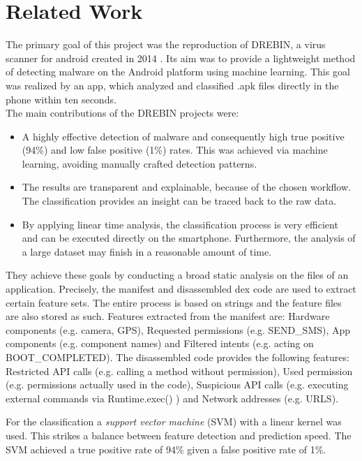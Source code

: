 \section{Related Work}

The primary goal of this project was the reproduction of DREBIN, a
virus scanner for android created in 2014 \cite{drebin}.
Its aim was to provide a lightweight method of detecting malware on
the Android platform using machine learning. This goal was realized
by an app, which analyzed and classified .apk files directly in the
phone within ten seconds. \\
The main contributions of the DREBIN projects were: 
\begin{itemize}
\item A highly effective detection of malware and consequently high true
positive (94\%) and low false positive (1\%) rates. This was achieved
via machine learning, avoiding manually crafted detection patterns. 
\item The results are transparent and explainable, because of the chosen
workflow. The classification provides an insight can be traced back
to the raw data. 
\item By applying linear time analysis, the classification process is very
efficient and can be executed directly on the smartphone. Furthermore,
the analysis of a large dataset may finish in a reasonable amount
of time.
\end{itemize}
They achieve these goals by conducting a broad static analysis on
the files of an application. Precisely, the manifest and disassembled
dex code are used to extract certain feature sets. The entire process
is based on strings and the feature files are also stored as such.
Features extracted from the manifest are: Hardware components (e.g.
camera, GPS), Requested permissions (e.g. SEND\_SMS), App components
(e.g. component names) and Filtered intents (e.g. acting on BOOT\_COMPLETED).
The disassembled code provides the following features: Restricted
API calls (e.g. calling a method without permission), Used permission
(e.g. permissions actually used in the code), Suspicious API calls
(e.g. executing external commands via Runtime.exec() ) and Network
addresses (e.g. URLS). 

For the classification a \emph{support vector machine} (SVM) \cite{cristianini2000introduction} with a linear kernel was used. This strikes a balance between feature detection and prediction speed. The SVM achieved a true positive rate of 94\% given a false positive rate of 1\%.